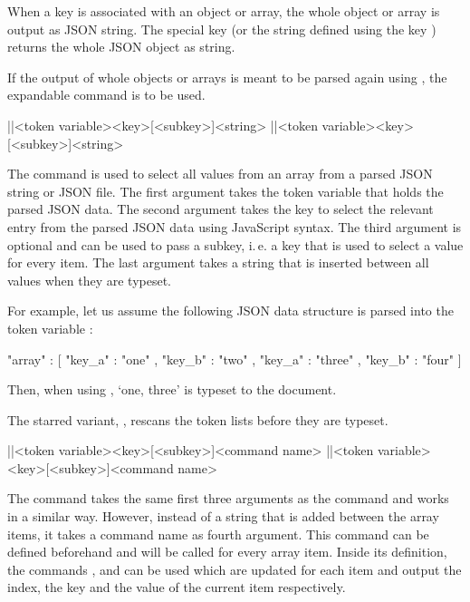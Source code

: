 \documentclass[a4paper]{article}
\begin{document}
{{When a key is associated with an object or array, the whole object or array is output as JSON string. The special key  (or the string defined using the key ) returns the whole JSON object as string. 

If the output of whole objects or arrays is meant to be parsed again using \macro{\JSONParse}, the expandable command \macro{\JSONParseExpandableValue} is to be used. 

\begin{macrodef}
|\JSONParseArrayValues|{<token variable>}{<key>}[<subkey>]{<string>}
|\JSONParseArrayValues*|{<token variable>}{<key>}[<subkey>]{<string>}
\end{macrodef}
The command \macro{\JSONParseArrayValues} is used to select all values from an array from a parsed JSON string or JSON file. The first argument takes the token variable that holds the parsed JSON data. The second argument takes the key to select the relevant entry from the parsed JSON data using JavaScript syntax. The third argument is optional and can be used to pass a subkey, i.\,e. a key that is used to select a value for every item. The last argument takes a string that is inserted between all values when they are typeset.

For example, let us assume the following JSON data structure is parsed into the token variable \macro{\myJSONdata}:

\begin{codeexample}
{
  "array" : [
    {
      "key_a" : "one" ,
      "key_b" : "two"
    } ,
    {
      "key_a" : "three" ,
      "key_b" : "four"
    }
  ]
}
\end{codeexample}

Then, when using , `one, three' is typeset to the document. 

The starred variant, \macro{\JSONParseArrayValues*}, rescans the token lists before they are typeset. 

\begin{macrodef}
|\JSONParseArrayValuesMap|{<token variable>}{<key>}[<subkey>]{<command name>}
|\JSONParseArrayValuesMap*|{<token variable>}{<key>}[<subkey>]{<command name>}
\end{macrodef}
The command \macro{\JSONParseArrayValuesMap} takes the same first three arguments as the command \macro{\JSONParseArrayValues} and works in a similar way. However, instead of a string that is added between the array items, it takes a command name as fourth argument. This command can be defined beforehand and will be called for every array item. Inside its definition, the commands \macro{\JSONParseArrayIndex}, \macro{\JSONParseArrayKey} and \macro{\JSONParseArrayValue} can be used which are updated for each item and output the index, the key and the value of the current item respectively. 

}}
\end{document}
